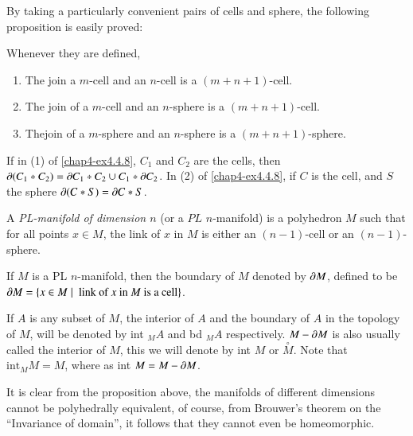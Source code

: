 By taking a particularly convenient pairs of cells and sphere, the following proposition is easily proved:

\begin{ex}\label{chap4-ex4.4.8}
Whenever they are defined,
\begin{enumerate}
\renewcommand{\labelenumi}{(\theenumi)}
\item The join a $m$-cell and an $n$-cell is a $(m+n+1)$-cell.

\item The join of a $m$-cell and an $n$-sphere is a $(m+n+1)$-cell.

\item The\pageoriginale join of a $m$-sphere and an $n$-sphere is a $(m+n+1)$-sphere.
\end{enumerate}

If in (1) of \ref{chap4-ex4.4.8}, $C_{1}$ and $C_{2}$ are the cells, then $\partial (C_{1}\ast C_{2})=\partial C_{1}\ast C_{2}\cup C_{1}\ast \partial C_{2}$. In (2) of \ref{chap4-ex4.4.8}, if $C$ is the cell, and $S$ the sphere $\partial (C\ast S)=\partial C\ast S$.
\end{ex}

\begin{definition}\label{chap4-defi4.4.9}
A {\em PL-manifold of dimension $n$} (or a $PL$ $n$-manifold) is a polyhedron $M$ such that for all points $x\in M$, the link of $x$ in $M$ is either an $(n-1)$-cell or an $(n-1)$-sphere.
\end{definition}

\begin{definition}\label{chap4-defi4.4.10}
If $M$ is a PL $n$-manifold, then the boundary of $M$ denoted by $\partial M$, defined to be $\partial M=\{x\in M\mid \text{ link of $x$ in $M$ is a cell}\}$.
\end{definition}

\begin{notation*}
If $A$ is any subset of $M$, the interior of $A$ and the boundary of $A$ in the topology of $M$, will be denoted by int ${}_{M}A$ and bd ${}_{M}A$ respectively. $M-\partial M$ is also usually called the interior of $M$, this we will denote by int $M$ or $\overset{\circ}{M}$. Note that $\text{int}_{M}M=M$, where as int $M=M-\partial M$.

It is clear from the proposition above, the manifolds of different dimensions cannot be polyhedrally equivalent, of course, from Brouwer's theorem on the ``Invariance of domain'', it follows that they cannot even be homeomorphic.
\end{notation*}

